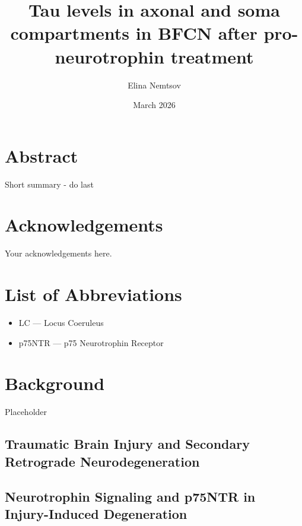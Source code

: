 \documentclass[
]{article}
\title{Tau levels in axonal and soma compartments in BFCN after pro-neurotrophin treatment}
\author{Elina Nemtsov}
\date{March 2026}
\providecommand{\tightlist}{%
  \setlength{\itemsep}{0pt}\setlength{\parskip}{0pt}}
\begin{document}
\maketitle

{
\setcounter{tocdepth}{2}
\tableofcontents
}
\section*{Abstract}\label{abstract}

Short summary - do last

\section*{Acknowledgements}\label{acknowledgements}

Your acknowledgements here.

\section*{List of Abbreviations}\label{list-of-abbreviations}

\begin{itemize}
\tightlist
\item
  LC --- Locus Coeruleus
\item
  p75NTR --- p75 Neurotrophin Receptor
\end{itemize}

\section{Background}\label{background}

Placeholder

\subsection{Traumatic Brain Injury and Secondary Retrograde Neurodegeneration}\label{traumatic-brain-injury-and-secondary-retrograde-neurodegeneration}

\subsection{Neurotrophin Signaling and p75NTR in Injury-Induced Degeneration}\label{neurotrophin-signaling-and-p75ntr-in-injury-induced-degeneration}
\end{document}
